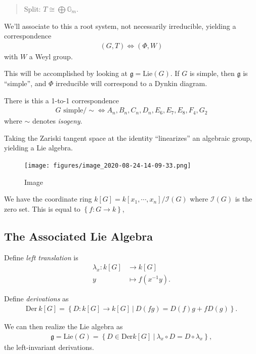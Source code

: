 \begin{quote}
Split: \(T\cong \bigoplus {\mathbb{G}}_m\).
\end{quote}

We'll associate to this a root system, not necessarily irreducible,
yielding a correspondence
\begin{align*}   (G, T) \iff (\Phi, W) \end{align*} with \(W\) a Weyl
group.

This will be accomplished by looking at
\({\mathfrak{g}}= \mathrm{Lie}(G)\). If \(G\) is simple, then
\({\mathfrak{g}}\) is ``simple'', and \(\Phi\) irreducible will
correspond to a Dynkin diagram.

There is this a 1-to-1 correspondence
\begin{align*}   G \text{ simple}/\sim \iff A_n, B_n, C_n, D_n, E_6, E_7, E_8, F_4, G_2 \end{align*}
where \(\sim\) denotes \emph{isogeny}.

Taking the Zariski tangent space at the identity ``linearizes'' an
algebraic group, yielding a Lie algebra.

\begin{figure}
\centering
\texttt{[image: figures/image\_2020-08-24-14-09-33.png]}
\caption{Image}
\end{figure}

We have the coordinate ring
\(k[G] = k[x_1, \cdots, x_n] / \mathcal{I}(G)\) where \(\mathcal{I}(G)\)
is the zero set. This is equal to \(\left\{{f:G\to k}\right\}\),

\hypertarget{the-associated-lie-algebra}{%
\subsection{The Associated Lie
Algebra}\label{the-associated-lie-algebra}}

\begin{definition}

\begin{definition}

Define \emph{left translation} is
\begin{align*}   \lambda_x: k[G] &\to k[G] \\ y &\mapsto f(x^{-1} y) .\end{align*}

Define \emph{derivations} as
\begin{align*}   \mathrm{Der} ~k[G] = \left\{{D: k[G] \to k[G] {~\mathrel{\Big|}~}D(fg) = D(f) g + f D(g) }\right\} .\end{align*}

We can then realize the Lie algebra as
\begin{align*}   {\mathfrak{g}}= \mathrm{Lie}(G) = \left\{{D\in \mathrm{Der} k[G] {~\mathrel{\Big|}~}\lambda_x \circ D = D\circ \lambda_x}\right\} ,\end{align*}
the left-invariant derivations.

\end{definition}

\end{definition}

